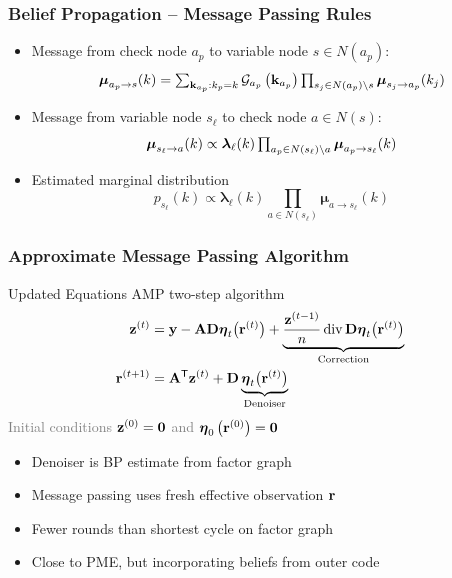 
\begin{frame}
\frametitle{Belief Propagation -- Message Passing Rules}
\begin{center}
\scalebox{0.85}{}
\end{center}
\begin{itemize}
\item Message from check node $a_p$ to variable node $s \in N(a_p)$:
\begin{equation*}
\textstyle \boldsymbol{\mu}_{a_p \to s} (k)
= \sum_{\mathbf{k}_{a_p}: k_p = k} \mathcal{G}_{a_p} \left( \mathbf{k}_{a_p} \right)
\prod_{s_j \in N(a_p) \setminus s} \boldsymbol{\mu}_{s_j \to a_p} (k_j)
\end{equation*}
\item Message from variable node $s_{\ell}$ to check node $a \in N(s)$:
\begin{equation*}
\textstyle \boldsymbol{\mu}_{s_{\ell} \rightarrow a} (k)
\propto \boldsymbol{\lambda}_{\ell} (k) \prod_{a_p \in N(s_{\ell}) \setminus a} \boldsymbol{\mu}_{a_p \to s_{\ell}} (k)
\end{equation*}
\item Estimated marginal distribution
\begin{equation*}
\textstyle p_{s_{\ell}} (k) \propto \boldsymbol{\lambda}_{\ell} (k) \prod_{a \in N(s_{\ell})} \boldsymbol{\mu}_{a \to s_{\ell}} (k)
\end{equation*}
\end{itemize}
\end{frame}


\begin{frame}
\frametitle{Approximate Message Passing Algorithm}
\begin{block}{Updated Equations}
AMP two-step algorithm
\begin{align*}
\mathbf{z}^{(t)} &= \mathbf{y} - \mathbf{A} \mathbf{D} \boldsymbol{\eta}_t \big( \mathbf{r}^{(t)} \big)
+ \underbrace{\frac{\mathbf{z}^{(t-1)}}{n} \operatorname{div} \mathbf{D} \boldsymbol{\eta}_t \big( \mathbf{r}^{(t)} \big)}_{\text{Correction}} \\
\mathbf{r}^{(t+1)} &= \mathbf{A}^{\mathsf{T}} \mathbf{z}^{(t)} + \mathbf{D}
\underbrace{\boldsymbol{\eta}_t \big( \mathbf{r}^{(t)} \big)}_{\text{Denoiser}}
\end{align*}
\textcolor{gray}{Initial conditions $\mathbf{z}^{(0)} = \mathbf{0}$ and $\boldsymbol{\eta}_0 \left( \mathbf{r}^{(0)} \right) = \mathbf{0}$}
\end{block}
\begin{itemize}
\item Denoiser is BP estimate from factor graph
\item Message passing uses fresh effective observation $\mathbf{r}$
\item Fewer rounds than shortest cycle on factor graph
\item Close to PME, but incorporating beliefs from outer code
\end{itemize}
\end{frame}

